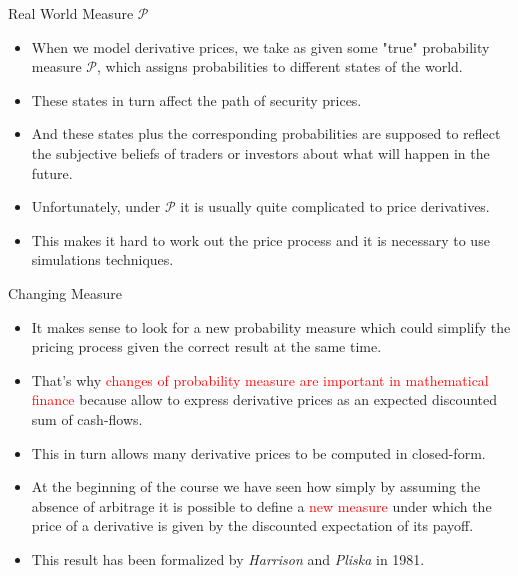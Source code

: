 \documentclass{beamer}
\begin{document}
\begin{frame}{Real World Measure $\mathcal{P}$}
\begin{itemize}
	\item When we model derivative prices, we take as given some "true" probability measure $\mathcal{P}$, which assigns probabilities to different states of the world. 
	\item These states in turn affect the path of security prices. 
	\item And these states plus the corresponding probabilities are supposed to reflect the subjective beliefs of traders or investors about what will happen in the future.
	\item Unfortunately, under $\mathcal{P}$ it is usually quite complicated to price derivatives.
	\item This makes it hard to work out the price process and it is necessary to use simulations techniques.
	\end{itemize}
\end{frame}

\begin{frame}{Changing Measure}
\begin{itemize}
	\item It makes sense to look for a new probability measure which could simplify the pricing process given the correct result at the same time.
	\item That's why \textcolor{red}{changes of probability measure are important in mathematical finance} because allow to express derivative prices as an expected discounted sum of cash-flows. 
	\item This in turn allows many derivative prices to be computed in closed-form.
	\item At the beginning of the course we have seen how simply by assuming the absence of arbitrage it is possible to define a \textcolor{red}{new measure} under which the price of a derivative is given by the discounted expectation of its payoff.
	\item This result has been formalized by \emph{Harrison} and \emph{Pliska} in 1981. 
	\end{itemize}
\end{frame}
\end{document}
